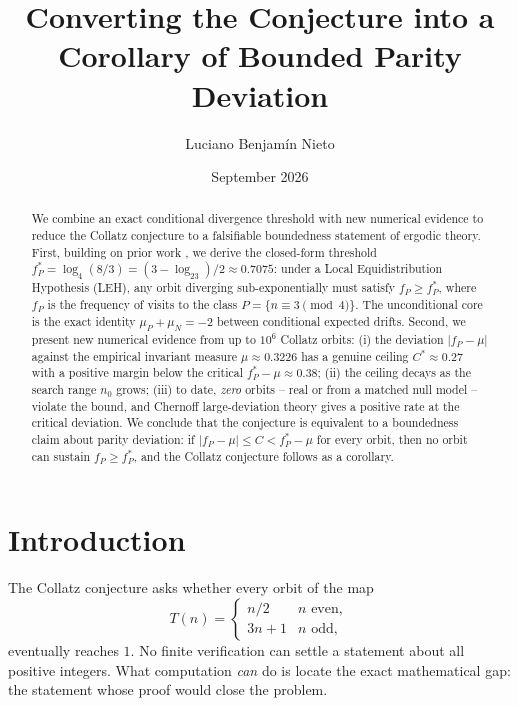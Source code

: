 \documentclass[12pt,reqno]{amsart}
\title[The Collatz Last Theorem]{%
Converting the Conjecture into a Corollary of Bounded Parity Deviation%
}
\author{Luciano Benjam\'{i}n Nieto}
\date{September 2026}
\theoremstyle{plain}
\theoremstyle{definition}
\newcommand{\logtwo}{\log_2}
\newcommand{\logfour}{\log_4}
\newcommand{\fP}{f_P}
\newcommand{\fPstar}{f_P^*}
\newcommand{\muP}{\mu_P}
\newcommand{\muN}{\mu_N}
\begin{document}
\begin{abstract}
We combine an exact conditional divergence threshold with new numerical
evidence to reduce the Collatz conjecture to a falsifiable boundedness
statement of ergodic theory. First, building on prior work \cite{chang2026paradigm},
we derive the closed-form threshold $ \fPstar = \logfour(8/3)
= (3 - \logtwo 3)/2 \approx 0.7075$: under a Local Equidistribution
Hypothesis (LEH), any orbit diverging sub-exponentially must satisfy
$\fP \geq \fPstar$, where $\fP$ is the frequency of visits to the class
$P = \{n \equiv 3 \pmod 4\}$. The unconditional core is the exact identity
$\muP + \muN = -2$ between conditional expected drifts. Second, we present
new numerical evidence from up to $10^6$ Collatz orbits: (i) the deviation
$|\fP - \mu|$ against the empirical invariant measure $\mu \approx 0.3226$
has a genuine ceiling $C^* \approx 0.27$ with a positive margin below the
critical $ \fPstar - \mu \approx 0.38$; (ii) the ceiling decays as the search
range $n_0$ grows; (iii) to date, \emph{zero} orbits -- real or from a
matched null model -- violate the bound, and Chernoff large-deviation theory
gives a positive rate at the critical deviation. We conclude that the
conjecture is equivalent to a boundedness claim about parity deviation: if
$|\fP - \mu| \le C < \fPstar - \mu$ for every orbit, then no orbit can
sustain $\fP \ge \fPstar$, and the Collatz conjecture follows as a corollary.
\end{abstract}

\maketitle

\section{Introduction}\label{sec:intro}

The Collatz conjecture asks whether every orbit of the map
\[
T(n) = \begin{cases} n/2 & n \text{ even},\\ 3n+1 & n \text{ odd}, \end{cases}
\]
eventually reaches $1$. No finite verification can settle a statement about
all positive integers. What computation \emph{can} do is locate the exact
mathematical gap: the statement whose proof would close the problem.
\end{document}
